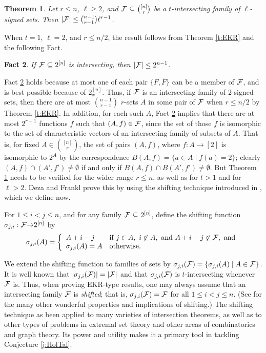 \documentclass{article}
\newtheorem{thm}{Theorem}%
\newtheorem{fct}[thm]{Fact}
\def\s{{\sigma}}
\def\cF{{\cal F}}
\def\oF{{\overline{F}}}
\def\mt{{\emptyset}}
\def\rar{{\rightarrow}}
\def\sse{{\subseteq}}
\begin{document}
\begin{thm}
\label{t:Signed}
Let $r\le n$, $\ell\ge 2$, and $\cF\ \sse\ \binom{[n]}{r}$ be a $t$-intersecting family of $\ell$-signed sets.
Then $|\cF|\le \binom{n-1}{r-1}\ell^{r-1}$.
\end{thm}

When $t=1$, $\ell=2$, and $r\le n/2$, the result follows from Theorem \ref{t:EKR} and the following Fact.

\begin{fct}
\label{f:Half}
If $\cF\ \sse\ 2^{[n]}$ is intersecting, then $|\cF|\le 2^{n-1}$.
\end{fct}

Fact \ref{f:Half} holds because at most one of each pair $\{F,\oF\}$ can be a member of $\cF$, and is best possible because of $2^{[n]}_x$.
Thus, if $\cF$ is an intersecting family of 2-signed sets, then there are at most $\binom{n-1}{r-1}$ $r$-sets $A$ in some pair of $\cF$ when $r\le n/2$ by Theorem \ref{t:EKR}.
In addition, for each such $A$, Fact \ref{f:Half} implies that there are at most $2^{r-1}$ functions $f$ such that $(A,f)\in\cF$, since the set of those $f$ is isomorphic to the set of characteristic vectors of an intersecting family of subsets of $A$.
That is, for fixed $A\in\binom{[n]}{r}$, the set of pairs $(A,f)$, where $f:A\rar [2]$ is isomorphic to $2^A$ by the correspondence $B(A,f)=\{a\in A\mid f(a)=2\}$; clearly $(A,f)\cap (A',f')\not=\mt$ if and only if $B(A,f)\cap B(A',f')\not=\mt$.
But Theorem \ref{t:Signed} needs to be verified for the wider range $r\le n$, as well as for $t>1$ and for $\ell>2$.
Deza and Frankl \cite{DezaFran} prove this by using the shifting technique introduced in \cite{ErdKoRad}, which we define now.

For $1\le i<j\le n$, and for any family $\cF\ \sse\ 2^{[n]}$, define the shifting function $\s_{j,i}:\cF\rar 2^{[n]}$ by 
\[
\s_{j,i}(A) = \left\{
\begin{array}{ll}
A+i-j & \mbox{if}\ j\in A,\ i\not\in A,\ \mbox{and}\ A+i-j\not\in\cF,\ \mbox{and}\\
\s_{j,i}(A)=A & \mbox{otherwise.}
\end{array}
\right.
\]

We extend the shifting function to families of sets by $\s_{j,i}(\cF) = \{\s_{j,i}(A)\mid A\in\cF\}$.
It is well known that $|\s_{j,i}(\cF)| = |\cF|$ and that $\s_{j,i}(\cF)$ is $t$-intersecting whenever $\cF$ is.
Thus, when proving EKR-type results, one may always assume that an intersecting family $\cF$ is {\it shifted}; that is, $\s_{j,i}(\cF)=\cF$ for all $1\le i<j\le n$.
(See \cite{FranklShifting} for the many other wonderful properties and implications of shifting.)
The shifting technique as been applied to many varieties of intersection theorems, as well as to other types of problems in extremal set theory and other areas of combinatorics and graph theory.
Its power and utility makes it a primary tool in tackling Conjecture \ref{j:HolTal}.
\end{document}
